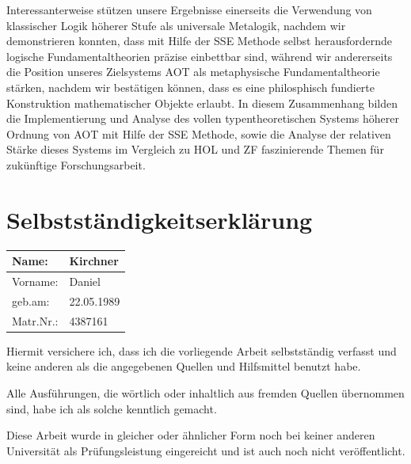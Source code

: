 \documentclass[a4paper,enabledeprecatedfontcommands,abstract=on,twoside=true]{scrreprt}
\numberwithin{TODO}{chapter}
\numberwithin{equation}{section}
\begin{document}
Interessanterweise stützen unsere Ergebnisse einerseits die Verwendung von klassischer Logik h\"oherer Stufe als universale Metalogik, nachdem wir demonstrieren konnten, dass mit Hilfe der SSE Methode selbst herausfordernde logische Fundamentaltheorien präzise einbettbar sind, während wir andererseits die Position unseres Zielsystems AOT als metaphysische Fundamentaltheorie st\"arken, nachdem wir best\"atigen k\"onnen, dass es eine philosphisch fundierte Konstruktion mathematischer Objekte erlaubt. In diesem Zusammenhang bilden die Implementierung und Analyse des vollen typentheoretischen Systems h\"oherer Ordnung von AOT mit Hilfe der SSE Methode, sowie die Analyse der relativen St\"arke dieses Systems im Vergleich zu HOL und ZF faszinierende Themen f\"ur zuk\"unftige Forschungsarbeit.

\cleardoublepage

\chapter*{Selbstst\"andigkeitserkl\"arung}

\begin{center}
\setlength\extrarowheight{4pt}
\begin{tabularx}{\textwidth}{|X|X|}
\hline
Name: & Kirchner \\
\hline
Vorname: & Daniel \\
\hline
geb.am: & 22.05.1989 \\
\hline
Matr.Nr.: & 4387161 \\
\hline
\end{tabularx}
\end{center}

Hiermit versichere ich, dass ich die vorliegende Arbeit selbstst\"andig
verfasst und keine anderen als die angegebenen Quellen und Hilfsmittel
benutzt habe.

Alle Ausf\"uhrungen, die w\"ortlich oder inhaltlich aus fremden Quellen
\"ubernommen sind, habe ich als solche kenntlich gemacht.

Diese Arbeit wurde in gleicher oder \"ahnlicher Form noch bei keiner
anderen Universit\"at als Pr\"ufungsleistung eingereicht und ist auch
noch nicht ver\"offentlicht.

\end{document}

